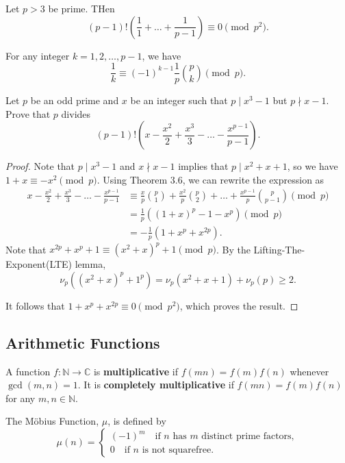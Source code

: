 \documentclass[11pt]{article}
\newcommand{\N}{\mathbb{N}}
\newcommand{\C}{\mathbb C}
\renewcommand{\>}{\rangle}
\newcommand{\<}{\langle}
\begin{document}
\begin{theorem} Let $p > 3$ be prime.  THen
$$(p-1)! \left (\frac{1}{1} + \dots + \frac{1}{p-1} \right) \equiv 0 \pmod{p^2}.$$
\end{theorem}
\begin{theorem}
For any integer $k = 1, 2, \dots, p-1$, we have 
$$\frac{1}{k} \equiv (-1)^{k-1} \frac{1}{p} \binom{p}{k} \pmod{p}.$$
\end{theorem}

\begin{problem}[ELMO 2009] Let $p$ be an odd prime and $x$ be an integer such that $p \mid x^3 - 1$ but $p \nmid x-1$.  Prove that $p$ divides 
$$(p-1)! \left ( x - \frac{x^2}{2} + \frac{x^3}{3} - \dots - \frac{x^{p-1}}{p-1}\right).$$
\end{problem}
\begin{proof}
Note that $p \mid x^3 - 1$ and $x \nmid x-1$ implies that $p \mid x^2 + x + 1$, so we have $1 + x \equiv -x^2 \pmod{p}$.
Using Theorem $3.6$, we can rewrite the expression as 
\begin{align*}
x - \frac{x^2}{2} + \frac{x^3}{3} - \dots - \frac{x^{p-1}}{p-1} &\equiv \frac{x}{p} \binom{p}{1} + \frac{x^2}{p} \binom{p}{2} + \dots + \frac{x^{p-1}}{p} \binom{p}{p-1} \pmod{p} \\
&=  \frac{1}{p} \left ((1 + x)^p - 1 - x^p \right) \pmod{p} \\
&= -\frac{1}{p} \left (1 + x^p + x^{2p} \right).
\end{align*}
Note that $x^{2p} + x^p + 1 \equiv (x^2 + x)^p + 1 \pmod{p}$.  By the Lifting-The-Exponent(LTE) lemma, $$\nu_p((x^2 + x)^p + 1^p) = \nu_p (x^2 + x + 1) + \nu_p(p) \ge 2.$$

It follows that $1 + x^p + x^{2p} \equiv 0 \pmod{p^2}$, which proves the result.  
\end{proof}
\subsection{Arithmetic Functions}
\begin{definition} A function $f: \N \to \C$ is \textbf{multiplicative} if $f(mn) = f(m)f(n)$ whenever $\gcd(m, n) = 1$.  It is \textbf{completely multiplicative} if $f(mn) = f(m)f(n)$ for any $m, n \in \N$.
\end{definition}

\begin{definition} The Möbius Function, $\mu$, is defined by 
$$\mu(n) = \begin{cases}
(-1)^m \quad \text{if }n \text{ has }m \text{ distinct prime factors}, \\
0 \quad \text{if }n \text{ is not squarefree}.
\end{cases}$$
\end{definition}
\end{document}
